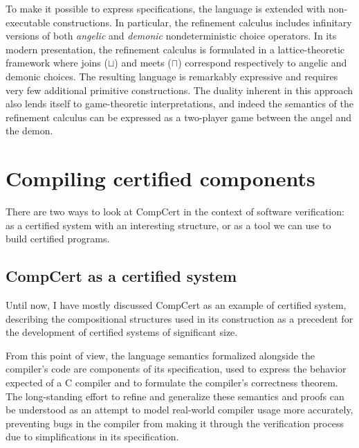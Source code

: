 \documentclass[11pt,oneside,draft]{book}
\theoremstyle{definition}
\begin{document}
To make it possible to express specifications,
the language is extended with non-executable constructions.
In particular,
the refinement calculus includes infinitary versions of both
\emph{angelic} and \emph{demonic} nondeterministic choice operators.
In its modern presentation,
the refinement calculus is formulated in a lattice-theoretic framework
where joins ($\sqcup$) and meets ($\sqcap$)
correspond respectively to angelic and demonic choices.
The resulting language is remarkably expressive
and requires very few additional primitive constructions.
The duality inherent in this approach
also lends itself to game-theoretic interpretations,
and indeed the semantics of the refinement calculus
can be expressed as a two-player game between
the angel and the demon.

%



\section{Compiling certified components} %

There are two ways to look at CompCert
in the context of software verification:
as a certified system
with an interesting structure,
or as a tool
we can use to build certified programs.

\subsection{CompCert as a certified system}

Until now,
I have mostly discussed
CompCert as an example of certified system,
describing the compositional structures used in
its construction as a precedent for the development of
certified systems of significant size.

From this point of view,
the language semantics
formalized alongside the compiler's code
are components of its specification,
used to express the behavior expected of
a C compiler
and to formulate the compiler's correctness theorem.
The long-standing effort to refine and generalize
these semantics and proofs
can be understood as
an attempt to model real-world compiler usage
more accurately,
preventing bugs in the compiler
from making it through the verification process
due to simplifications in its specification.
\end{document}
